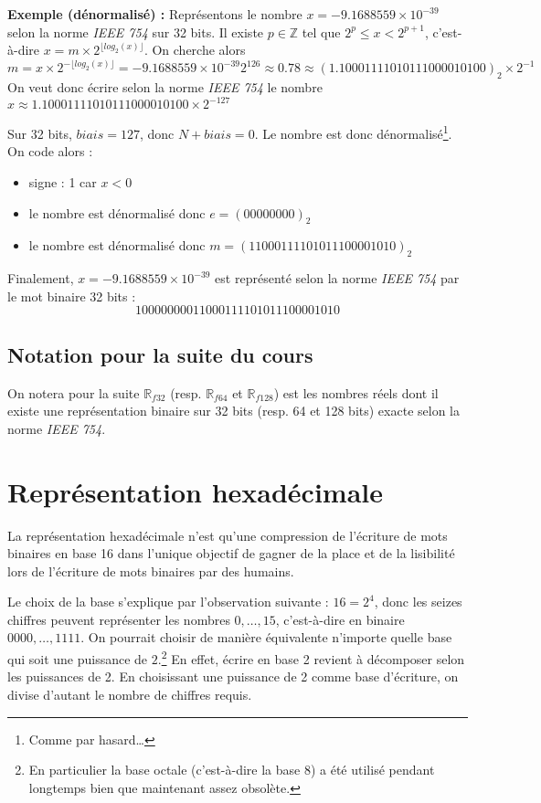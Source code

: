 \documentclass[../../main.tex]{subfiles}
\begin{document}
\textbf{Exemple (dénormalisé) : } Représentons le nombre $x = -9.1688559\times{10^{-39}}$ selon la norme \textit{IEEE 754} sur 32 bits. \newline
Il existe $p\in{\mathbb{Z}}$ tel que $2^{p}\leq x < 2^{p+1}$, c'est-à-dire $x = m\times{2^{\lfloor log_{2}(x)\rfloor}}$.\newline
On cherche alors $m = x\times 2^{-\lfloor log_2(x)\rfloor} = -9.1688559\times10^{-39}2^{126} \approx 0.78 \approx (1.10001111010111000010100)_{2}\times{2^{-1}}$ \newline
On veut donc écrire selon la norme \textit{IEEE 754} le nombre $x \approx 1.10001111010111000010100\times{2^{-127}}$

Sur 32 bits, $biais = 127$, donc $N + biais = 0$. Le nombre est donc dénormalisé\footnote{Comme par hasard\dots}. On code alors :
\begin{itemize}
  \item signe : 1 car $x < 0$
  \item le nombre est dénormalisé donc $e = (00000000)_2$
  \item le nombre est dénormalisé donc $m = (11000111101011100001010)_2$
\end{itemize}
Finalement, $x = -9.1688559\times{10^{-39}}$ est représenté selon la norme \textit{IEEE 754} par le mot binaire 32 bits : $$10000000011000111101011100001010$$
\subsection{Notation pour la suite du cours}
On notera pour la suite $\mathbb{R}_{f32}$ (resp. $\mathbb{R}_{f64}$ et $\mathbb{R}_{f128
}$) est les nombres réels dont il existe une représentation binaire sur 32 bits (resp. 64 et 128 bits) exacte selon la norme \textit{IEEE 754}.
\section{Représentation hexadécimale}
La représentation hexadécimale n'est qu'une compression de l'écriture de mots binaires en base 16 dans l'unique objectif de gagner de la place et de la lisibilité lors de l'écriture de mots binaires par des humains.

Le choix de la base s'explique par l'observation suivante : $16 = 2^{4}$, donc les seizes chiffres peuvent représenter les nombres $0, \dots, 15$, c'est-à-dire en binaire $0000, \dots, 1111$. On pourrait choisir de manière équivalente n'importe quelle base qui soit une puissance de $2$.\footnote{En particulier la base octale (c'est-à-dire la base 8) a été utilisé pendant longtemps bien que maintenant assez obsolète.} En effet, écrire en base 2 revient à décomposer selon les puissances de 2. En choisissant une puissance de 2 comme base d'écriture, on divise d'autant le nombre de chiffres requis.
\end{document}

